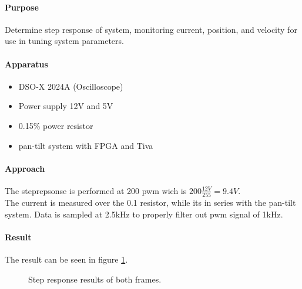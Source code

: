 \documentclass[../../main]{subfiles}
\begin{document}
\paragraph{Purpose}%
\label{par:purpose}

Determine step response of system, monitoring current, position, and velocity for use in tuning system parameters.

\paragraph{Apparatus}%
\label{par:apperateur}
\begin{itemize}
	\item DSO-X 2024A (Oscilloscope)
	\item Power supply 12\si{V} and 5\si{V}
	\item 0.1\si{\Omega}5\% power resistor
	\item pan-tilt system with FPGA and Tiva
\end{itemize}


\paragraph{Approach}%
\label{par:approach}
The steprepsonse is performed at 200 pwm wich is $200\frac{12\si{V}}{255} = 9.4\si{V}$.\\
The current is measured over the 0.1\si{\Omega} resistor, while its in series with the pan-tilt system.
Data is sampled at 2.5\si{kHz} to properly filter out pwm signal of 1\si{kHz}.

\paragraph{Result}%
\label{par:result}

The result can be seen in figure \ref{fig:jour_step_bot}.


\begin{figure}[H]
        \centering
				\def\svgwidth{0.47\columnwidth}
				\def\svgwidth{0.47\columnwidth}
				\caption{Step response results of both frames.}
				\label{fig:jour_step_bot}
\end{figure}
\end{document}
